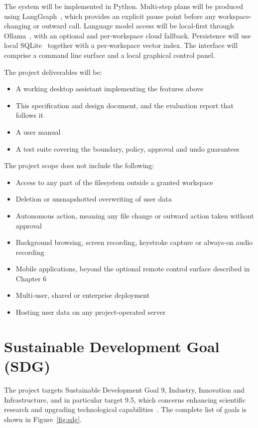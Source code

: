 \documentclass{FastFyp}
\begin{document}
The system will be implemented in Python. Multi-step plans will be produced using LangGraph~\cite{ref:langgraph}, which provides an explicit pause point before any workspace-changing or outward call. Language model access will be local-first through Ollama~\cite{ref:ollama}, with an optional and per-workspace cloud fallback. Persistence will use local SQLite~\cite{ref:sqlite} together with a per-workspace vector index. The interface will comprise a command line surface and a local graphical control panel.

The project deliverables will be:

\begin{itemize}
    \item A working desktop assistant implementing the features above
    \item This specification and design document, and the evaluation report that follows it
    \item A user manual
    \item A test suite covering the boundary, policy, approval and undo guarantees
\end{itemize}

The project scope does not include the following:

\begin{itemize}
    \item Access to any part of the filesystem outside a granted workspace
    \item Deletion or unsnapshotted overwriting of user data
    \item Autonomous action, meaning any file change or outward action taken without approval
    \item Background browsing, screen recording, keystroke capture or always-on audio recording
    \item Mobile applications, beyond the optional remote control surface described in Chapter 6
    \item Multi-user, shared or enterprise deployment
    \item Hosting user data on any project-operated server
\end{itemize}

\section{Sustainable Development Goal (SDG)}
The project targets Sustainable Development Goal 9, Industry, Innovation and Infrastructure, and in particular target 9.5, which concerns enhancing scientific research and upgrading technological capabilities~\cite{ref:sdg}. The complete list of goals is shown in Figure~\ref{fig:sdg}.
\end{document}
